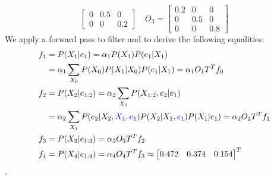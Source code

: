 \documentclass[9pt,a4paper]{extarticle}
\newenvironment{solution}
    {%
    \color{red}
    }
    { 
    \color{black}
    }
\begin{document}
\begin{enumerate}
\begin{solution}
$$\begin{bmatrix}
       0 & 0.5 & 0\\
       0 & 0 & 0.2
       \end{bmatrix} \quad O_3 = \begin{bmatrix}
       0.2 & 0 & 0\\
       0 & 0.5 & 0\\
       0 & 0 & 0.8
       \end{bmatrix}
       $$
       We apply a forward pass to filter and to derive the following equalities:
       \begin{align}
           f_{1} &= P(X_1|e_1) = \alpha_1 P(X_1)P(e_1|X_1) \nonumber \\
           &= \alpha_1 \sum_{X_0}P(X_0)P(X_1|X_0)P(e_1|X_1) = \alpha_1 O_{1} T^T f_0  \\
           f_{2} &= P(X_2|e_{1:2}) = \alpha_2 \sum_{X_1} P(X_{1:2}, e_{2}|e_1) \nonumber \\
           &= \alpha_2 \sum_{X_1} P(e_2| X_2, \textcolor{blue}{X_1, e_1})P(X_2|X_1, \textcolor{blue}{e_1})P(X_1|e_1) = \alpha_2 O_2T^Tf_1\\
           f_{3} &= P(X_3|e_{1:3}) = \alpha_3 O_3 T^T f_2\\
           f_{4} &= P(X_4|e_{1:4}) = \alpha_4 O_4 T^T f_3 \approx \begin{bmatrix} 0.472 & 0.374 & 0.154 \end{bmatrix}^T
       \end{align}.
       

\end{solution}
\end{enumerate}
\end{document}
